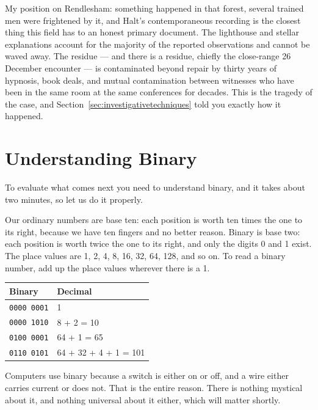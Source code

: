 My position on Rendlesham: something happened in that forest, several trained men were
frightened by it, and Halt's contemporaneous recording is the closest thing this field has
to an honest primary document. The lighthouse and stellar explanations account for the
majority of the reported observations and cannot be waved away. The residue --- and there is
a residue, chiefly the close-range 26 December encounter --- is contaminated beyond repair
by thirty years of hypnosis, book deals, and mutual contamination between witnesses who
have been in the same room at the same conferences for decades. This is the tragedy of the
case, and Section~\ref{sec:investigativetechniques} told you exactly how it happened.

\section{Understanding Binary}\label{sec:understandingbinary}

To evaluate what comes next you need to understand binary, and it takes about two minutes,
so let us do it properly.

Our ordinary numbers are base ten: each position is worth ten times the one to its right,
because we have ten fingers and no better reason. Binary is base two: each position is
worth twice the one to its right, and only the digits 0 and 1 exist. The place values are
1, 2, 4, 8, 16, 32, 64, 128, and so on. To read a binary number, add up the place values
wherever there is a 1.

\begin{center}\small
\setlength{\tabcolsep}{1.1em}
\begin{tabular}{@{}ll@{}}
\toprule
\textbf{Binary} & \textbf{Decimal}\\
\midrule
\texttt{0000\,0001} & 1\\
\texttt{0000\,1010} & 8 + 2 = 10\\
\texttt{0100\,0001} & 64 + 1 = 65\\
\texttt{0110\,0101} & 64 + 32 + 4 + 1 = 101\\
\bottomrule
\end{tabular}
\end{center}

Computers use binary because a switch is either on or off, and a wire either carries
current or does not. That is the entire reason. There is nothing mystical about it, and
nothing universal about it either, which will matter shortly.

